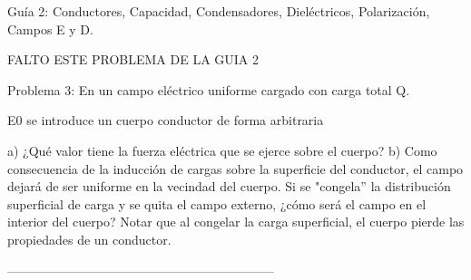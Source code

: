 
Guía 2: Conductores, Capacidad, Condensadores, Dieléctricos, Polarización, Campos E y D.

FALTO ESTE PROBLEMA DE LA GUIA 2

 
Problema 3:
En un campo eléctrico uniforme cargado con carga total Q.

E0    se introduce un cuerpo conductor de forma arbitraria
 
a)	¿Qué valor tiene la fuerza eléctrica que se ejerce sobre el cuerpo?
b)	Como consecuencia de la inducción de cargas sobre la superficie del conductor, el campo dejará de ser uniforme en la vecindad del cuerpo. Si se "congela'' la distribución superficial de carga y se quita el campo externo, ¿cómo será el campo en el interior del cuerpo? Notar que al congelar la carga superficial, el cuerpo pierde las propiedades de un conductor.


---------------------------------------------------------------


